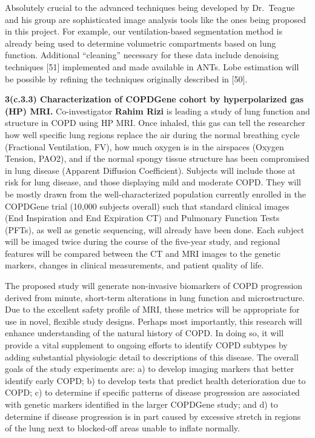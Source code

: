 \documentclass[11pt,]{article}
\begin{document}
Absolutely crucial to the advanced techniques being developed by
Dr.~Teague and his group are sophisticated image analysis tools like the
ones being proposed in this project. For example, our ventilation-based
segmentation method is already being used to determine volumetric
compartments based on lung function. Additional ``cleaning'' necessary
for these data include denoising techniques {[}51{]} implemented and
made available in ANTs. Lobe estimation will be possible by refining the
techniques originally described in {[}50{]}.

\textbf{3(c.3.3) Characterization of COPDGene cohort by hyperpolarized
gas (HP) MRI.} Co-investigator \textbf{Rahim Rizi} is leading a study of
lung function and structure in COPD using HP MRI. Once inhaled, this gas
can tell the researcher how well specific lung regions replace the air
during the normal breathing cycle (Fractional Ventilation, FV), how much
oxygen is in the airspaces (Oxygen Tension, PAO2), and if the normal
spongy tissue structure has been compromised in lung disease (Apparent
Diffusion Coefficient). Subjects will include those at risk for lung
disease, and those displaying mild and moderate COPD. They will be
mostly drawn from the well-characterized population currently enrolled
in the COPDGene trial (10,000 subjects overall) such that standard
clinical images (End Inspiration and End Expiration CT) and Pulmonary
Function Tests (PFTs), as well as genetic sequencing, will already have
been done. Each subject will be imaged twice during the course of the
five-year study, and regional features will be compared between the CT
and MRI images to the genetic markers, changes in clinical measurements,
and patient quality of life.

The proposed study will generate non-invasive biomarkers of COPD
progression derived from minute, short-term alterations in lung function
and microstructure. Due to the excellent safety profile of MRI, these
metrics will be appropriate for use in novel, flexible study designs.
Perhaps most importantly, this research will enhance understanding of
the natural history of COPD. In doing so, it will provide a vital
supplement to ongoing efforts to identify COPD subtypes by adding
substantial physiologic detail to descriptions of this disease. The
overall goals of the study experiments are: a) to develop imaging
markers that better identify early COPD; b) to develop tests that
predict health deterioration due to COPD; c) to determine if specific
patterns of disease progression are associated with genetic markers
identified in the larger COPDGene study; and d) to determine if disease
progression is in part caused by excessive stretch in regions of the
lung next to blocked-off areas unable to inflate normally.
\end{document}
